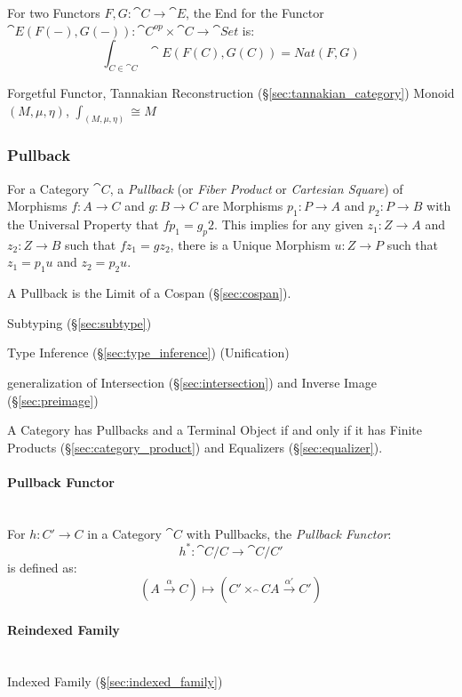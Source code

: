For two Functors $F,G : \cat{C} \rightarrow \cat{E}$, the End for
the Functor $\cat{E}(F(-), G(-)) : \cat{C}^{op} \times
\cat{C} \rightarrow \cat{Set}$ is:
\[
  \int_{C \in \cat{C}} \cat{E}(F(C), G(C)) = Nat (F,G)
\]

Forgetful Functor, Tannakian Reconstruction
(\S\ref{sec:tannakian_category}) %
Monoid $(M,\mu,\eta)$, $\int_{(M,\mu,\eta)} \cong M$



\subsubsection{Pullback}\label{sec:pullback}

For a Category $\cat{C}$, a \emph{Pullback} (or \emph{Fiber
  Product} or \emph{Cartesian Square}) of Morphisms $f : A \rightarrow
C$ and $g : B \rightarrow C$ are Morphisms $p_1 : P \rightarrow A$ and
$p_2 : P \rightarrow B$ with the Universal Property that $fp_1 =
g_p2$. This implies for any given $z_1 : Z \rightarrow A$ and $z_2 : Z
\rightarrow B$ such that $fz_1 = gz_2$, there is a Unique Morphism $u
: Z \rightarrow P$ such that $z_1 = p_1 u$ and $z_2 = p_2 u$.

A Pullback is the Limit of a Cospan (\S\ref{sec:cospan}).

Subtyping (\S\ref{sec:subtype})

Type Inference (\S\ref{sec:type_inference}) (Unification)

generalization of Intersection (\S\ref{sec:intersection}) and Inverse
Image (\S\ref{sec:preimage})

A Category has Pullbacks and a Terminal Object if and only if it has
Finite Products (\S\ref{sec:category_product}) and Equalizers
(\S\ref{sec:equalizer}). \cite{awodey06}



\paragraph{Pullback Functor}\label{sec:pullback_functor}\cite{awodey06}
\hfill \\

For $h : C' \rightarrow C$ in a Category $\cat{C}$ with Pullbacks,
the \emph{Pullback Functor}:
\[
  h^* : \cat{C}/C \rightarrow \cat{C}/C'
\]
is defined as:
\[
  (A \xrightarrow{\alpha} C) \mapsto
    (C' \times_\cat{C} A \xrightarrow{\alpha '} C')
\]



\paragraph{Reindexed Family}\label{sec:reindexed_family}
\hfill \\
Indexed Family (\S\ref{sec:indexed_family})



